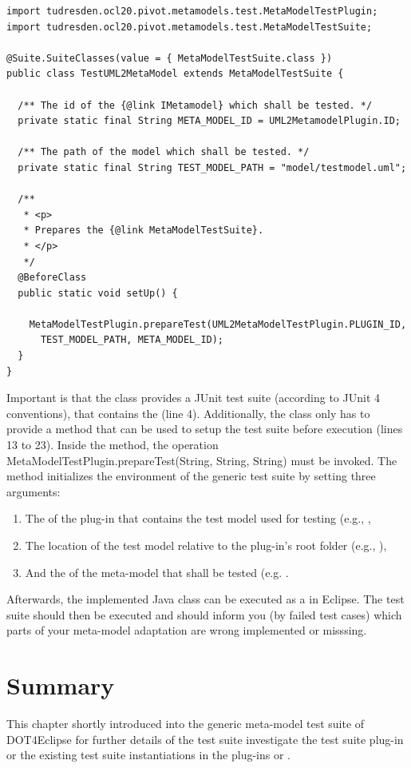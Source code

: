 \lstset{
  language=Java
}
\begin{lstlisting}[caption={An instantiation of the generic meta-model test suite.}, captionpos=b, label=list:metaModelTestSuite:constraints01, float]
import tudresden.ocl20.pivot.metamodels.test.MetaModelTestPlugin;
import tudresden.ocl20.pivot.metamodels.test.MetaModelTestSuite;

@Suite.SuiteClasses(value = { MetaModelTestSuite.class })
public class TestUML2MetaModel extends MetaModelTestSuite {

  /** The id of the {@link IMetamodel} which shall be tested. */
  private static final String META_MODEL_ID = UML2MetamodelPlugin.ID;

  /** The path of the model which shall be tested. */
  private static final String TEST_MODEL_PATH = "model/testmodel.uml";

  /**
   * <p>
   * Prepares the {@link MetaModelTestSuite}.
   * </p>
   */
  @BeforeClass
  public static void setUp() {

    MetaModelTestPlugin.prepareTest(UML2MetaModelTestPlugin.PLUGIN_ID, 
      TEST_MODEL_PATH, META_MODEL_ID);
  }
}
\end{lstlisting}

Important is that the class provides a JUnit test suite (according to JUnit 4 conventions), that contains the  (line 4). Additionally, the class only has to provide a  method that can be used to setup the test suite before execution (lines 13 to 23). Inside the  method, the operation MetaModelTestPlugin.prepareTest(String, String, String) must be invoked. The method initializes the environment of the generic test suite by setting three arguments:

\begin{enumerate}
	\item The  of the plug-in that contains the test model used for testing (e.g., ,
	\item The location of the test model relative to the plug-in's root folder (e.g., ),
	\item And the  of the meta-model that shall be tested (e.g. .
\end{enumerate}

Afterwards, the implemented Java class can be executed as a  in Eclipse. The test suite should then be executed and should inform you (by failed test cases) which parts of your meta-model adaptation are wrong implemented or misssing.


\section{Summary}

This chapter shortly introduced into the generic meta-model test suite of \acs{DOT4Eclipse} for further details of the test suite investigate the test suite plug-in  or the existing test suite instantiations in the plug-ins  or .
